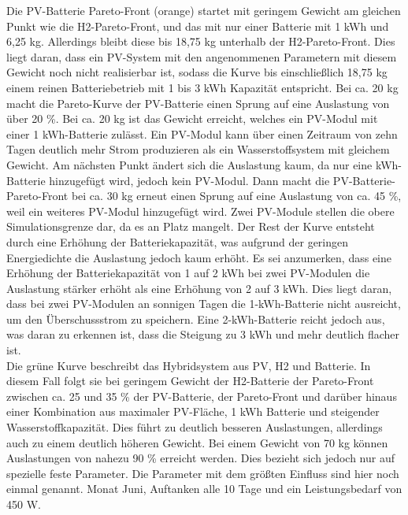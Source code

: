 Die PV-Batterie Pareto-Front (orange) startet mit geringem Gewicht am gleichen Punkt wie die H2-Pareto-Front, und das mit nur einer Batterie mit 1 kWh und 6,25 kg. Allerdings bleibt diese bis 18,75 kg unterhalb der H2-Pareto-Front. Dies liegt daran, dass ein PV-System mit den angenommenen Parametern mit diesem Gewicht noch nicht realisierbar ist, sodass die Kurve bis einschließlich 18,75 kg einem reinen Batteriebetrieb mit 1 bis 3 kWh Kapazität entspricht.
Bei ca. 20 kg macht die Pareto-Kurve der PV-Batterie einen Sprung auf eine Auslastung von über 20 \%. Bei ca. 20 kg ist das Gewicht erreicht, welches ein PV-Modul mit einer 1 kWh-Batterie zulässt. Ein PV-Modul kann über einen Zeitraum von zehn Tagen deutlich mehr Strom produzieren als ein Wasserstoffsystem mit gleichem Gewicht. Am nächsten Punkt ändert sich die Auslastung kaum, da nur eine kWh-Batterie hinzugefügt wird, jedoch kein PV-Modul. Dann macht die PV-Batterie-Pareto-Front bei ca. 30 kg erneut einen Sprung auf eine Auslastung von ca. 45 \%, weil ein weiteres PV-Modul hinzugefügt wird. Zwei PV-Module stellen die obere Simulationsgrenze dar, da es an Platz mangelt. Der Rest der Kurve entsteht durch eine Erhöhung der Batteriekapazität, was aufgrund der geringen Energiedichte die Auslastung jedoch kaum erhöht. Es sei anzumerken, dass eine Erhöhung der Batteriekapazität von 1 auf 2 kWh bei zwei PV-Modulen die Auslastung stärker erhöht als eine Erhöhung von 2 auf 3 kWh. Dies liegt daran, dass bei zwei PV-Modulen an sonnigen Tagen die 1-kWh-Batterie nicht ausreicht, um den Überschussstrom zu speichern. Eine 2-kWh-Batterie reicht jedoch aus, was daran zu erkennen ist, dass die Steigung zu 3 kWh und mehr deutlich flacher ist. \\

Die grüne Kurve beschreibt das Hybridsystem aus PV, H2 und Batterie. In diesem Fall folgt sie bei geringem Gewicht der H2-Batterie der Pareto-Front zwischen ca. 25 und 35 \% der PV-Batterie, der Pareto-Front und darüber hinaus einer Kombination aus maximaler PV-Fläche, 1 kWh Batterie und steigender Wasserstoffkapazität. Dies führt zu deutlich besseren Auslastungen, allerdings auch zu einem deutlich höheren Gewicht. Bei einem Gewicht von 70 kg können Auslastungen von nahezu 90 \% erreicht werden. Dies bezieht sich jedoch nur auf spezielle feste Parameter. Die Parameter mit dem größten Einfluss sind hier noch einmal genannt. Monat Juni, Auftanken alle 10 Tage und ein Leistungsbedarf von 450 W. \\

